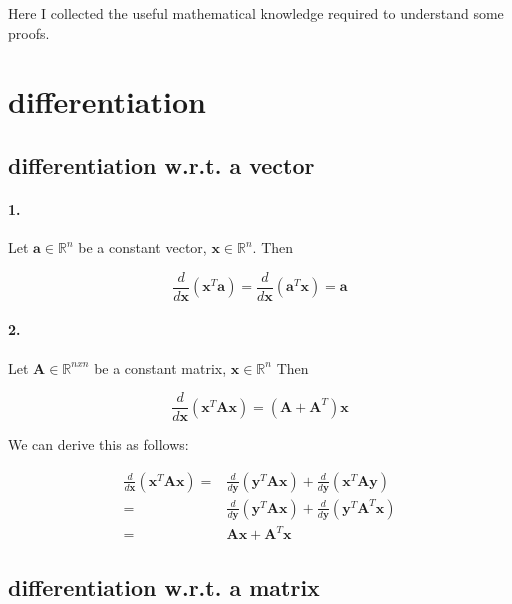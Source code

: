 \documentclass{article}
\begin{document}
\newpage
\begin{appendices}

Here I collected the useful mathematical knowledge required to understand some proofs.

\section{differentiation}

\subsection{differentiation w.r.t. a vector}

\paragraph{1.} Let $\mathbf{a} \in \mathbb{R}^n$ be a constant vector, $\mathbf{x} \in \mathbb{R}^n$. Then

\begin{equation} \label{eq:da_dx}
    \frac{d}{d\mathbf{x}} (\mathbf{x}^{T}\mathbf{a}) = \frac{d}{d\mathbf{x}} (\mathbf{a}^{T}\mathbf{x}) = \mathbf{a}
\end{equation}

\paragraph{2.} Let $\mathbf{A} \in \mathbb{R}^{nxn}$ be a constant matrix, $\mathbf{x} \in \mathbb{R}^n$ Then

\begin{equation} \label{eq:dA_dx}
    \frac{d}{d\mathbf{x}} (\mathbf{x}^{T}\mathbf{A}\mathbf{x}) = (\mathbf{A} + \mathbf{A}^T) \mathbf{x}
\end{equation}

We can derive this as follows:

\[
\begin{split}
    \frac{d}{d\mathbf{x}} (\mathbf{x}^{T}\mathbf{A}\mathbf{x}) =& \frac{d}{d\mathbf{y}} (\mathbf{y}^{T}\mathbf{A}\mathbf{x}) + \frac{d}{d\mathbf{y}} (\mathbf{x}^{T}\mathbf{A}\mathbf{y})\\
    =& \frac{d}{d\mathbf{y}} (\mathbf{y}^{T}\mathbf{A}\mathbf{x}) + \frac{d}{d\mathbf{y}} (\mathbf{y}^T\mathbf{A}^{T}\mathbf{x})\\
    =& \mathbf{A}\mathbf{x} + \mathbf{A}^T\mathbf{x}
\end{split}
\]


\subsection{differentiation w.r.t. a matrix}


\end{appendices}
\end{document}
